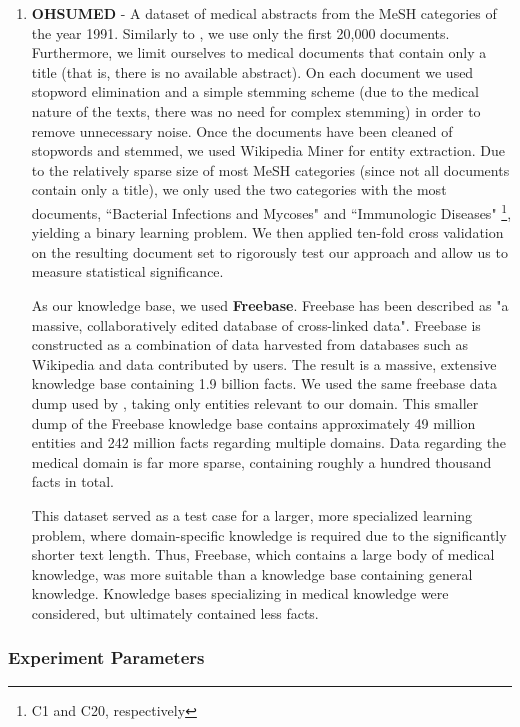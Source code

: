 \documentclass[twoside,11pt]{article}
\theoremstyle{definition}
\begin{document}
\begin{enumerate}
	\item \textbf{OHSUMED} \cite{hersh1994ohsumed} - A dataset of medical abstracts from the MeSH categories of the year 1991. Similarly to  , we use only the first 20,000 documents. Furthermore, we limit ourselves to medical documents that contain only a title (that is, there is no available abstract). On each document we used stopword elimination and a simple stemming scheme (due to the medical nature of the texts, there was no need for complex stemming) in order to remove unnecessary noise. Once the documents have been cleaned of stopwords and stemmed, we used Wikipedia Miner \cite{milne2013open} for entity extraction. 
	Due to the relatively sparse size of most MeSH categories (since not all documents contain only a title), we only used the two categories with the most documents, ``Bacterial Infections and Mycoses" and ``Immunologic Diseases" \footnote{C1 and C20, respectively}, yielding a binary learning problem. We then applied ten-fold cross validation on the resulting document set to rigorously test our approach and allow us to measure statistical significance.
	
	As our knowledge base, we used \textbf{Freebase}.
	Freebase has been described as "a massive, collaboratively edited database of cross-linked data". Freebase is constructed as a combination of data harvested from databases such as Wikipedia and data contributed by users. The result is a massive, extensive knowledge base containing 1.9 billion facts. 
	 We used the same freebase data dump used by , taking only entities relevant to our domain. This smaller dump of the Freebase knowledge base contains approximately 49 million entities and 242 million facts regarding multiple domains. Data regarding the medical domain is far more sparse, containing roughly a hundred thousand facts in total.
	
	This dataset served as a test case for a larger, more specialized learning problem, where domain-specific knowledge is required due to the significantly shorter text length. Thus, Freebase, which contains a large body of medical knowledge, was more suitable than a knowledge base containing general knowledge. Knowledge bases specializing in medical knowledge were considered, but ultimately contained less facts.
\end{enumerate}

\subsubsection{Experiment Parameters}
\end{document}
